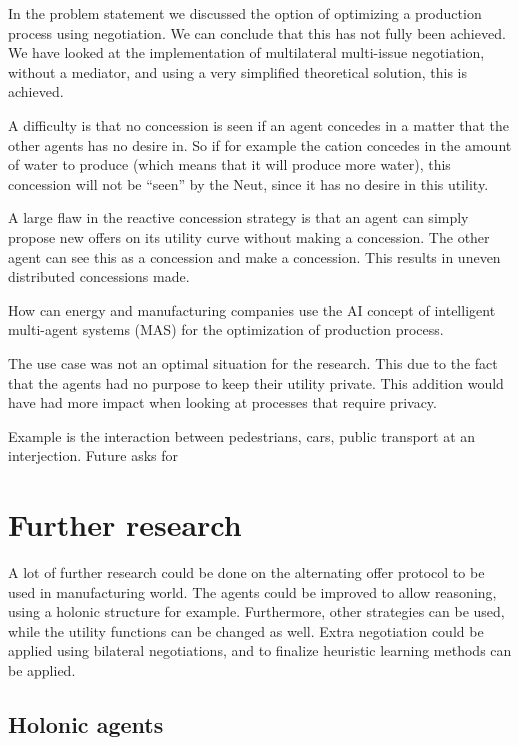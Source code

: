 In the problem statement we discussed the option of optimizing a production process using negotiation. We can conclude that this has not fully been achieved. We have looked at the implementation of multilateral multi-issue negotiation, without a mediator, and using a very simplified theoretical solution, this is achieved. 

A difficulty is that no concession is seen if an agent concedes in a matter that the other agents has no desire in. So if for example the cation concedes in the amount of water to produce (which means that it will produce more water), this concession will not be ``seen'' by the Neut, since it has no desire in this utility. %

A large flaw in the reactive concession strategy is that an agent can simply propose new offers on its utility curve without making a concession. The other agent can see this as a concession and make a concession. This results in uneven distributed concessions made. 

How can energy and manufacturing companies use the AI concept of intelligent multi-agent systems (MAS) for the optimization of production process.

The use case was not an optimal situation for the research. This due to the fact that the agents had no purpose to keep their utility private. This addition would have had more impact when looking at processes that require privacy.

Example is the interaction between pedestrians, cars, public transport at an interjection. Future asks for 

\section{Further research}
A lot of further research could be done on the alternating offer protocol to be used in manufacturing world. The agents could be improved to allow reasoning, using a holonic structure for example. Furthermore, other strategies can be used, while the utility functions can be changed as well. Extra negotiation could be applied using bilateral negotiations, and to finalize heuristic learning methods can be applied.

\subsection{Holonic agents}

